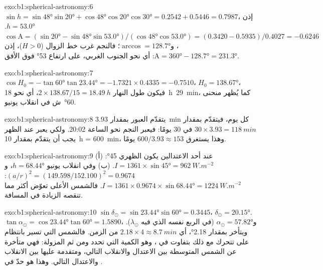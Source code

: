 \begin{solution}{exo:b1:spherical-astronomy:6}
$\sin h = \sin\ang{48}\sin\ang{20} + \cos\ang{48}\cos\ang{20}\cos\ang{30}
= 0.2542 + 0.5446 = 0.7987$، إذن $h = \ang{53.0}$.
$\cos\mathrm{A} = (\sin\ang{20} - \sin\ang{48}\sin\ang{53.0})/(\cos\ang{48}
\cos\ang{53.0}) = (0.3420 - 0.5935)/0.4027 = -0.6246$، و$\arccos = \ang{128.7}$؛
فالنجم غرب خط الزوال ($H > 0$)، إذن $\mathrm{A} = \ang{360} -
\ang{128.7} = \ang{231.3}$: أي نحو الجنوب الغربي، على ارتفاع \ang{53} فوق الأفق.
\end{solution}

\begin{solution}{exo:b1:spherical-astronomy:7}
$\cos H_0 = -\tan\ang{60}\tan\ang{23.44} = -1.7321\times0.4335 = -0.7510$،
$H_0 = \ang{138.67}$، فيكون طول النهار $2\times138.67/15 = \qty{18.49}{h}$، أي نحو
\qty{18}{h}~\qty{29}{min}، كما يُظهر منحنى \ang{60}~ش في انقلاب يونيو.
\end{solution}

\begin{solution}{exo:b1:spherical-astronomy:8}
يتقدّم العبور بمقدار \qty{3.93}{min} كل يوم، فيتقدّم بمقدار $30\times3.93 =
\qty{118}{min}$ في 30 يومًا: فيعبر النجم نحو الساعة 20:02. ولكي يعبر عند الظهر يجب أن يتقدّم بمقدار \qty{10}{h} = \qty{600}{min}، وهذا يستغرق
$600/3.93 \approx 153$ يومًا.
\end{solution}

\begin{solution}{exo:b1:spherical-astronomy:9}
(أ) عند أحد الاعتدالين يكون  الظهري \ang{45}: $I = 1361\times\sin\ang{45}
= \qty{962}{W.m^{-2}}$. (ب) وفي انقلاب يونيو $h = \ang{68.44}$، و
$(a/r)^2 = (149.598/152.100)^2 = 0.9674$:
$I = 1361\times0.9674\times\sin\ang{68.44} = \qty{1224}{W.m^{-2}}$. فالشمس الأعلى تعوّض أكثر مما تنقصه الزيادة في المسافة.
\end{solution}

\begin{solution}{exo:b1:spherical-astronomy:10}
$\sin\delta_\odot = \sin\ang{23.44}\sin\ang{60} = 0.3445$،
$\delta_\odot = \ang{20.15}$. $\tan\alpha_\odot = \cos\ang{23.44}\tan\ang{60}
= 1.5890$، و$\alpha_\odot = \ang{57.82}$ (في الربع نفسه الذي فيه $\lambda_\odot$).
ويتأخر  بمقدار \ang{2.18}، أي $2.18\times4 \approx
\qty{8.7}{min}$ من الزمن. فالشمس التي تسير بانتظام على  تتحرك مع ذلك بتفاوت في ، وهو الكمية التي تحدد  ومن ثم المزولة: فهي متأخرة عن الشمس المتوسطة بين الاعتدال والانقلاب التالي، ومتقدمة عليها بين الانقلاب والاعتدال التالي. وهذا هو حدّ  في .
\end{solution}

